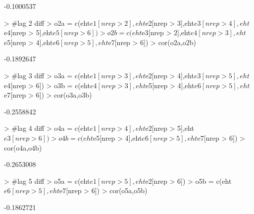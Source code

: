 \documentclass[11pt]{article}
\begin{document}
\begin{Schunk}
\begin{Soutput}
[1] -0.1000537
\end{Soutput}
\begin{Sinput}
> #lag 2 diff
> o2a = c(eht$e1[nrep > 2],eht$e2[nrep > 3],eht$e3[nrep > 4],eht$e4[nrep > 5],eht$e5[nrep > 6])
> o2b = c(eht$e3[nrep > 2],eht$e4[nrep > 3],eht$e5[nrep > 4],eht$e6[nrep > 5],eht$e7[nrep > 6])
> cor(o2a,o2b)
\end{Sinput}
\begin{Soutput}
[1] -0.1892647
\end{Soutput}
\begin{Sinput}
> #lag 3 diff  
> o3a = c(eht$e1[nrep > 3],eht$e2[nrep > 4],eht$e3[nrep > 5],eht$e4[nrep > 6])
> o3b = c(eht$e4[nrep > 3],eht$e5[nrep > 4],eht$e6[nrep > 5],eht$e7[nrep > 6])
> cor(o3a,o3b)
\end{Sinput}
\begin{Soutput}
[1] -0.2558842
\end{Soutput}
\begin{Sinput}
> #lag 4 diff
> o4a = c(eht$e1[nrep > 4],eht$e2[nrep > 5],eht$e3[nrep > 6])
> o4b = c(eht$e5[nrep > 4],eht$e6[nrep > 5],eht$e7[nrep > 6])
> cor(o4a,o4b)
\end{Sinput}
\begin{Soutput}
[1] -0.2653008
\end{Soutput}
\begin{Sinput}
> #lag 5 diff
> o5a = c(eht$e1[nrep > 5],eht$e2[nrep > 6])
> o5b = c(eht$e6[nrep > 5],eht$e7[nrep > 6])
> cor(o5a,o5b)
\end{Sinput}
\begin{Soutput}
[1] -0.1862721
\end{Soutput}
\end{Schunk}
\end{document}
